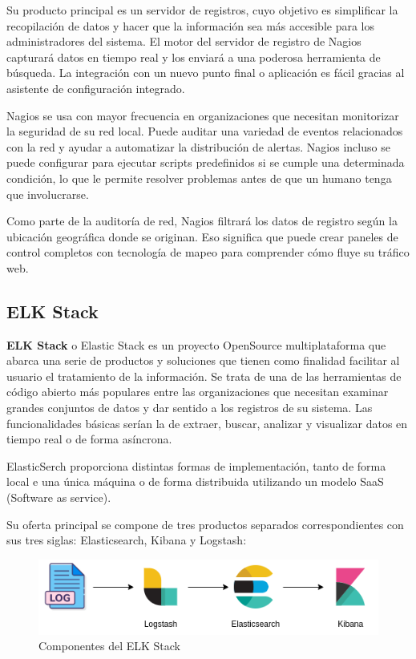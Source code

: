 Su producto principal es un servidor de registros, cuyo objetivo es simplificar la recopilación de datos y hacer que la información sea más accesible para los administradores del sistema. El motor del servidor de registro de Nagios capturará datos en tiempo real y los enviará a una poderosa herramienta de búsqueda. La integración con un nuevo punto final o aplicación es fácil gracias al asistente de configuración integrado.

Nagios se usa con mayor frecuencia en organizaciones que necesitan monitorizar la seguridad de su red local. Puede auditar una variedad de eventos relacionados con la red y ayudar a automatizar la distribución de alertas. Nagios incluso se puede configurar para ejecutar scripts predefinidos si se cumple una determinada condición, lo que le permite resolver problemas antes de que un humano tenga que involucrarse.

Como parte de la auditoría de red, Nagios filtrará los datos de registro según la ubicación geográfica donde se originan. Eso significa que puede crear paneles de control completos con tecnología de mapeo para comprender cómo fluye su tráfico web.

\subsection{ELK Stack}
\label{sec:elk_stack}
\textbf{ELK Stack} o Elastic Stack es un proyecto OpenSource multiplataforma que abarca una serie de productos y soluciones que tienen como finalidad facilitar al usuario el tratamiento de la información. Se trata de una de las herramientas de código abierto más populares entre las organizaciones que necesitan examinar grandes conjuntos de datos y dar sentido a los registros de su sistema. Las funcionalidades básicas serían la de extraer, buscar, analizar y visualizar datos en tiempo real o de forma asíncrona.

ElasticSerch proporciona distintas formas de implementación, tanto de forma local e una única máquina o de forma distribuida utilizando un modelo SaaS (Software as service).

Su oferta principal se compone de tres productos separados correspondientes con sus tres siglas: Elasticsearch, Kibana y Logstash:

\begin{figure}[H]
\centerline{\includegraphics[width=15cm]{figuras/elkstack.png}}
\caption{Componentes del ELK Stack}
\label{enlace1}
\end{figure}

